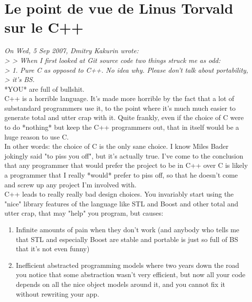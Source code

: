 \newpage

\chapter*{Le point de vue de Linus Torvald sur le C++}

\textit{On Wed, 5 Sep 2007, Dmitry Kakurin wrote:\\
>
> When I first looked at Git source code two things struck me as odd:\\
> 1. Pure C as opposed to C++. No idea why. Please don't talk about portability,
> it's BS.}\\

*YOU* are full of bullshit.\\

C++ is a horrible language. It's made more horrible by the fact that a lot
of substandard programmers use it, to the point where it's much much
easier to generate total and utter crap with it. Quite frankly, even if
the choice of C were to do *nothing* but keep the C++ programmers out,
that in itself would be a huge reason to use C.\\

In other words: the choice of C is the only sane choice. I know Miles
Bader jokingly said "to piss you off", but it's actually true. I've come
to the conclusion that any programmer that would prefer the project to be
in C++ over C is likely a programmer that I really *would* prefer to piss
off, so that he doesn't come and screw up any project I'm involved with.\\

C++ leads to really really bad design choices. You invariably start using
the "nice" library features of the language like STL and Boost and other
total and utter crap, that may "help" you program, but causes:\\

\begin{enumerate}

 \item Infinite amounts of pain when they don't work (and anybody who tells me
   that STL and especially Boost are stable and portable is just so full
   of BS that it's not even funny)

 \item Inefficient abstracted programming models where two years down the road
   you notice that some abstraction wasn't very efficient, but now all
   your code depends on all the nice object models around it, and you
   cannot fix it without rewriting your app.\\
\end{enumerate}

